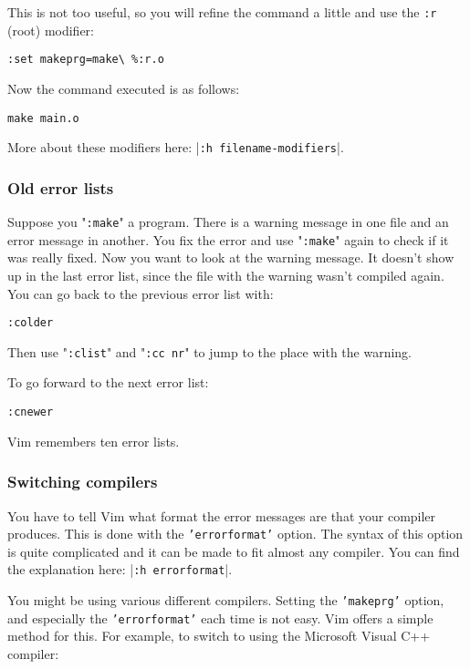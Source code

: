 This is not too useful, so you will refine the command a little and use the \texttt{:r} (root) modifier:

\begin{Verbatim}[samepage=true]
 :set makeprg=make\ %:r.o
\end{Verbatim}

Now the command executed is as follows:

\begin{Verbatim}[samepage=true]
 make main.o
\end{Verbatim}

More about these modifiers here: |\texttt{:h filename-modifiers}|.
\subsubsection{Old error lists}
Suppose you "\texttt{:make}" a program.
There is a warning message in one file and an error message in another.
You fix the error and use "\texttt{:make}" again to check if it was really fixed.
Now you want to look at the warning message.
It doesn't show up in the last error list, since the file with the warning wasn't compiled again.
You can go back to the previous error list with:

\begin{Verbatim}[samepage=true]
 :colder
\end{Verbatim}

Then use "\texttt{:clist}" and "\texttt{:cc {nr}}" to jump to the place with the warning.

To go forward to the next error list:

\begin{Verbatim}[samepage=true]
 :cnewer
\end{Verbatim}

Vim remembers ten error lists.
\subsubsection{Switching compilers}
You have to tell Vim what format the error messages are that your compiler produces.
This is done with the \texttt{'errorformat'} option.
The syntax of this option is quite complicated and it can be made to fit almost any compiler.
You can find the explanation here: |\texttt{:h errorformat}|.

You might be using various different compilers.
Setting the \texttt{'makeprg'} option, and especially the \texttt{'errorformat'} each time is not easy.
Vim offers a simple method for this.
For example, to switch to using the Microsoft Visual C++ compiler:

